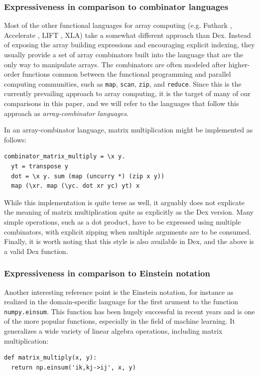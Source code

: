 \documentclass[acmsmall,screen,nonacm]{acmart}
\newlength{\codeindent}
\begin{document}
\subsubsection{Expressiveness in comparison to combinator languages}
\label{sec:array-combinator-languages}

Most of the other functional languages for array computing (e.g. Futhark \cite{henriksen2017futhark}, Accelerate \cite{chakravarty2011accelerate}, LIFT \cite{steuwer2017lift}, XLA) take a somewhat different approach than Dex.
Instead of exposing the array building expressions and encouraging explicit indexing, they usually provide a set of array combinators built into the language that are the only way to manipulate arrays.
The combinators are often modeled after higher-order functions common between the functional programming and parallel computing communities, such as \texttt{map}, \texttt{scan}, \texttt{zip}, and \texttt{reduce}.
Since this is the currently prevailing approach to array computing, it is the target of many of our comparisons in this paper, and we will refer to the languages that follow this approach as \emph{array-combinator languages}.

In an array-combinator language, matrix multiplication might be implemented as follows:
\begin{Verbatim}[xleftmargin=\codeindent,fontsize=\small]
combinator_matrix_multiply = \x y.
  yt = transpose y
  dot = \x y. sum (map (uncurry *) (zip x y))
  map (\xr. map (\yc. dot xr yc) yt) x
\end{Verbatim}
While this implementation is quite terse as well, it arguably does not explicate the meaning of matrix multiplication quite as explicitly as the Dex version.
Many simple operations, such as a dot product, have to be expressed using multiple combinators, with explicit zipping when multiple arguments are to be consumed.
Finally, it is worth noting that this style is also available in Dex, and the above is a valid Dex function.

\subsubsection{Expressiveness in comparison to Einstein notation}
\label{sec:einstein-notation}
Another interesting reference point is the Einstein notation, for instance as realized in the domain-specific language for the first arument to the function \texttt{numpy.einsum}.
This function has been hugely successful in recent years and is one of the more popular functions, especially in the field of machine learning.
It generalizes a wide variety of linear algebra operations, including matrix multiplication:
\begin{Verbatim}[xleftmargin=\codeindent,fontsize=\small]
def matrix_multiply(x, y):
  return np.einsum('ik,kj->ij', x, y)
\end{Verbatim}
\end{document}
